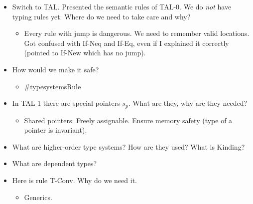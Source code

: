 \documentclass[11pt, a4paper]{article}
\begin{document}
\begin{itemize}
\begin{itemize}
\end{itemize}
\item Switch to TAL. Presented the semantic rules of TAL-0. We do \textit{not} have typing rules yet. Where do we need to take care and why?
\begin{itemize}
   \item Every rule with jump is dangerous. We need to remember valid locations. Got confused with If-Neq and If-Eq, even if I explained it correctly (pointed to If-New which has no jump).
\end{itemize}
\item How would we make it safe?
\begin{itemize}
   \item \#typesystemsRule
\end{itemize}
\item In TAL-1 there are special pointers $s_p$. What are they, why are they needed?
\begin{itemize}
   \item Shared pointers. Freely assignable. Ensure memory safety (type of a pointer is invariant).
\end{itemize}
\item What are higher-order type systems? How are they used? What is Kinding?
\item What are dependent types?
\item Here is rule T-Conv. Why do we need it.
\begin{itemize}
   \item Generics.
\end{itemize}
\end{itemize}
\end{document}
